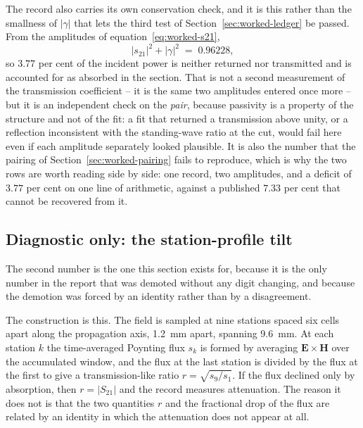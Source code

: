 The record also carries its own conservation check, and it is this rather than the smallness of $|\gamma|$ that
lets the third test of Section~\ref{sec:worked-ledger} be passed. From the amplitudes of
 equation~\eqref{eq:worked-s21},
\begin{equation}
  |s_{21}|^{2} + |\gamma|^{2} \;=\; 0.96228 ,
  \label{eq:worked-cw-passivity}
\end{equation}
so $3.77$ per cent of the incident power is neither returned nor transmitted and is accounted for as absorbed in
the section. That is not a second measurement of the transmission coefficient -- it is the same two amplitudes
entered once more -- but it is an independent check on the \emph{pair}, because passivity is a property of the
structure and not of the fit: a fit that returned a transmission above unity, or a reflection inconsistent with
the standing-wave ratio at the cut, would fail here even if each amplitude separately looked plausible. It is
also the number that the pairing of Section~\ref{sec:worked-pairing} fails to reproduce, which is why the two
rows are worth reading side by side: one record, two amplitudes, and a deficit of $3.77$ per cent on one line of
arithmetic, against a published $7.33$ per cent that cannot be recovered from it.

\subsection{Diagnostic only: the station-profile tilt}
\label{sec:worked-tilt}

The second number is the one this section exists for, because it is the only number in the report that was
demoted without any digit changing, and because the demotion was forced by an identity rather than by a
disagreement.

The construction is this. The field is sampled at nine stations spaced six cells apart along the propagation
axis, \SI{1.2}{mm} apart, spanning \SI{9.6}{mm}. At each station $k$ the time-averaged Poynting flux $s_k$ is
formed by averaging $\mathbf{E}\times\mathbf{H}$ over the accumulated window, and the flux at the last station is
divided by the flux at the first to give a transmission-like ratio $r = \sqrt{s_9/s_1}$. If the flux declined
only by absorption, then $r = |S_{21}|$ and the record measures attenuation. The reason it does not is that the
two quantities $r$ and the fractional drop of the flux are related by an identity in which the attenuation does
not appear at all.

